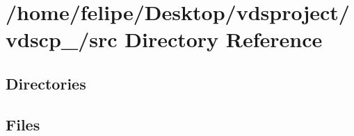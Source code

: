\section{/home/felipe/\+Desktop/vdsproject/vdscp\+\_/src Directory Reference}
\label{dir_68267d1309a1af8e8297ef4c3efbcdba}
\subsection*{Directories}
\begin{DoxyCompactItemize}
\end{DoxyCompactItemize}
\subsection*{Files}
\begin{DoxyCompactItemize}
\end{DoxyCompactItemize}
